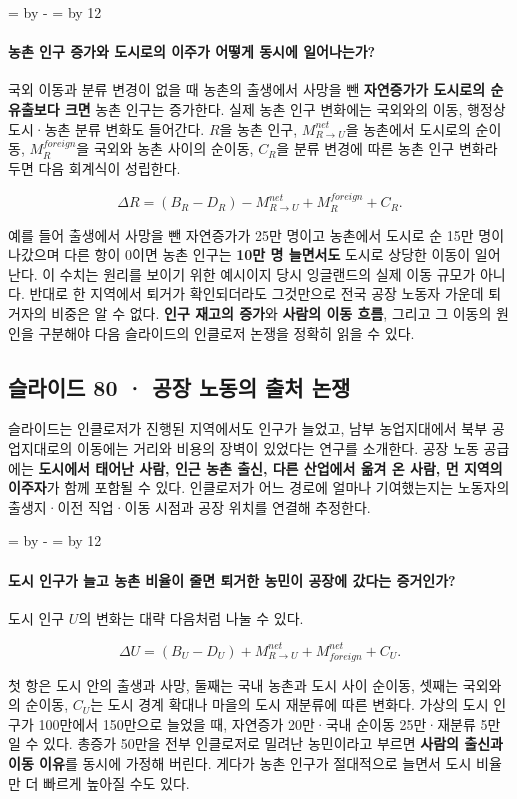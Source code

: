 \documentclass[10pt,a4paper]{article}
\newcommand{\ReserveQuestionSpace}{%
  \par\begingroup
  \dimen0=\pagegoal \advance\dimen0 by -\pagetotal
  \dimen2=\baselineskip \multiply\dimen2 by 12
  \ifdim\dimen0<\dimen2 \newpage\fi
  \endgroup}
\begin{document}
\ReserveQuestionSpace
\paragraph{농촌 인구 증가와 도시로의 이주가 어떻게 동시에 일어나는가?}
국외 이동과 분류 변경이 없을 때 농촌의 출생에서 사망을 뺀 \textbf{자연증가가 도시로의 순유출보다 크면} 농촌 인구는 증가한다. 실제 농촌 인구 변화에는 국외와의 이동, 행정상 도시·농촌 분류 변화도 들어간다. $R$을 농촌 인구, $M_{R\to U}^{net}$을 농촌에서 도시로의 순이동, $M_R^{foreign}$을 국외와 농촌 사이의 순이동, $C_R$을 분류 변경에 따른 농촌 인구 변화라 두면 다음 회계식이 성립한다.\par

\[
\Delta R=(B_R-D_R)-M_{R\to U}^{net}+M_R^{foreign}+C_R.
\]

예를 들어 출생에서 사망을 뺀 자연증가가 25만 명이고 농촌에서 도시로 순 15만 명이 나갔으며 다른 항이 0이면 농촌 인구는 \textbf{10만 명 늘면서도} 도시로 상당한 이동이 일어난다. 이 수치는 원리를 보이기 위한 예시이지 당시 잉글랜드의 실제 이동 규모가 아니다. 반대로 한 지역에서 퇴거가 확인되더라도 그것만으로 전국 공장 노동자 가운데 퇴거자의 비중은 알 수 없다. \textbf{인구 재고의 증가}와 \textbf{사람의 이동 흐름}, 그리고 그 이동의 원인을 구분해야 다음 슬라이드의 인클로저 논쟁을 정확히 읽을 수 있다.\par

\subsection{슬라이드 80 · 공장 노동의 출처 논쟁}
슬라이드는 인클로저가 진행된 지역에서도 인구가 늘었고, 남부 농업지대에서 북부 공업지대로의 이동에는 거리와 비용의 장벽이 있었다는 연구를 소개한다. 공장 노동 공급에는 \textbf{도시에서 태어난 사람, 인근 농촌 출신, 다른 산업에서 옮겨 온 사람, 먼 지역의 이주자}가 함께 포함될 수 있다. 인클로저가 어느 경로에 얼마나 기여했는지는 노동자의 출생지·이전 직업·이동 시점과 공장 위치를 연결해 추정한다.\par

\ReserveQuestionSpace
\paragraph{도시 인구가 늘고 농촌 비율이 줄면 퇴거한 농민이 공장에 갔다는 증거인가?}
도시 인구 $U$의 변화는 대략 다음처럼 나눌 수 있다.\par

\[
\Delta U=(B_U-D_U)+M_{R\to U}^{net}+M_{foreign}^{net}+C_U.
\]

첫 항은 도시 안의 출생과 사망, 둘째는 국내 농촌과 도시 사이 순이동, 셋째는 국외와의 순이동, $C_U$는 도시 경계 확대나 마을의 도시 재분류에 따른 변화다. 가상의 도시 인구가 100만에서 150만으로 늘었을 때, 자연증가 20만·국내 순이동 25만·재분류 5만일 수 있다. 총증가 50만을 전부 인클로저로 밀려난 농민이라고 부르면 \textbf{사람의 출신과 이동 이유}를 동시에 가정해 버린다. 게다가 농촌 인구가 절대적으로 늘면서 도시 비율만 더 빠르게 높아질 수도 있다.\par
\end{document}
